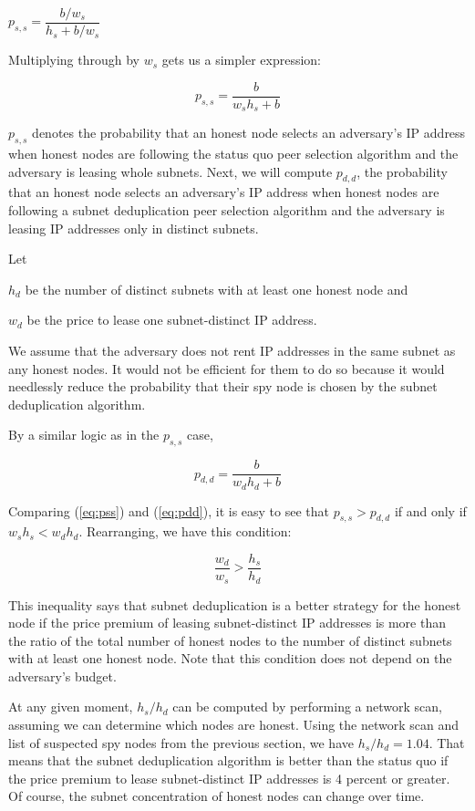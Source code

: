 \documentclass[english]{mrl}
\theoremstyle{plain}
\begin{document}
$p_{s,s}=\dfrac{b/w_{s}}{h_{s}+b/w_{s}}$

Multiplying through by $w_{s}$ gets us a simpler expression:

\begin{equation}
p_{s,s}=\dfrac{b}{w_{s}h_{s}+b}\label{eq:pss}
\end{equation}

$p_{s,s}$ denotes the probability that an honest node selects an
adversary's IP address when honest nodes are following the status
quo peer selection algorithm and the adversary is leasing whole subnets.
Next, we will compute $p_{d,d}$, the probability that an honest node
selects an adversary's IP address when honest nodes are following
a subnet deduplication peer selection algorithm and the adversary
is leasing IP addresses only in distinct subnets.

Let 

$h_{d}$ be the number of distinct subnets with at least one honest
node and

$w_{d}$ be the price to lease one subnet-distinct IP address.

We assume that the adversary does not rent IP addresses in the same
subnet as any honest nodes. It would not be efficient for them to
do so because it would needlessly reduce the probability that their
spy node is chosen by the subnet deduplication algorithm.

By a similar logic as in the $p_{s,s}$ case,

\begin{equation}
p_{d,d}=\dfrac{b}{w_{d}h_{d}+b}\label{eq:pdd}
\end{equation}

Comparing (\ref{eq:pss}) and (\ref{eq:pdd}), it is easy to see that
$p_{s,s}>p_{d,d}$ if and only if $w_{s}h_{s}<w_{d}h_{d}$. Rearranging,
we have this condition:

\begin{equation}
\dfrac{w_{d}}{w_{s}}>\dfrac{h_{s}}{h_{d}}
\end{equation}

This inequality says that subnet deduplication is a better strategy
for the honest node if the price premium of leasing subnet-distinct
IP addresses is more than the ratio of the total number of honest
nodes to the number of distinct subnets with at least one honest node.
Note that this condition does not depend on the adversary's budget.

At any given moment, $h_{s}/h_{d}$ can be computed by performing
a network scan, assuming we can determine which nodes are honest.
Using the network scan and list of suspected spy nodes from the previous
section, we have $h_{s}/h_{d}=1.04$. That means that the subnet deduplication
algorithm is better than the status quo if the price premium to lease
subnet-distinct IP addresses is 4 percent or greater. Of course, the
subnet concentration of honest nodes can change over time.
\end{document}
